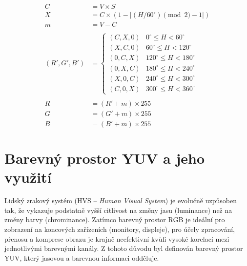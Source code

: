 \documentclass[FM,DP]{tulthesis}
\begin{document}
\[\begin{aligned}
        C            & = V \times S                                  \\
        X            & = C \times (1 - |(H / 60^\circ) \pmod 2 - 1|) \\
        m            & = V - C                                       \\
        \\
        (R', G', B') & = \begin{cases}
                             (C, X, 0) & 0^\circ \le H < 60^\circ    \\
                             (X, C, 0) & 60^\circ \le H < 120^\circ  \\
                             (0, C, X) & 120^\circ \le H < 180^\circ \\
                             (0, X, C) & 180^\circ \le H < 240^\circ \\
                             (X, 0, C) & 240^\circ \le H < 300^\circ \\
                             (C, 0, X) & 300^\circ \le H < 360^\circ
                         \end{cases} \\
        \\
        R            & = (R' + m) \times 255                         \\
        G            & = (G' + m) \times 255                         \\
        B            & = (B' + m) \times 255
    \end{aligned}\]

\newpage
\section{Barevný prostor YUV a jeho využití}

Lidský zrakový systém (HVS -- \textit{Human Visual System}) je evolučně
uzpůsoben tak, že vykazuje podstatně vyšší citlivost na změny jasu (luminance)
než na změny barvy (chrominance). Zatímco barevný prostor RGB je ideální pro
zobrazení na koncových zařízeních (monitory, displeje), pro účely zpracování,
přenosu a komprese obrazu je krajně neefektivní kvůli vysoké korelaci mezi
jednotlivými barevnými kanály. Z tohoto důvodu byl definován barevný prostor
YUV, který jasovou a barevnou informaci odděluje.
\end{document}

